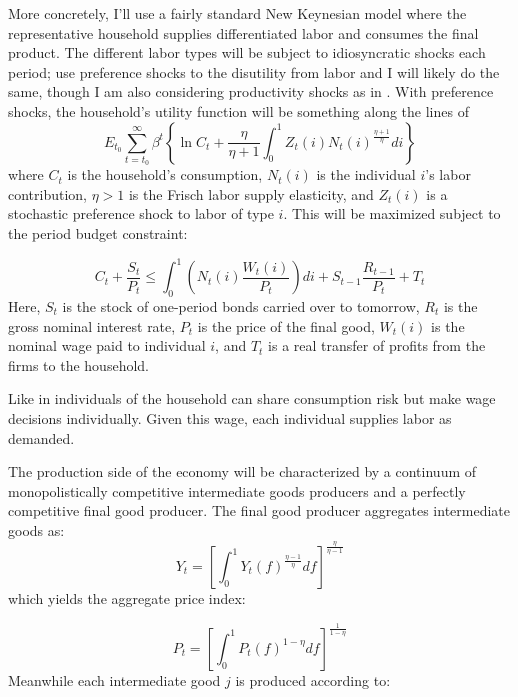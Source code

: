 \documentclass[12pt,a4paper]{article}            %
\begin{document}
More concretely, I'll use a fairly standard New Keynesian model where the representative household supplies differentiated labor and consumes the final product.
The different labor types will be subject to idiosyncratic shocks each period; \cite{daly_hobijn_2013} use preference shocks to the disutility from labor and I will likely do the same, though I am also considering productivity shocks as in \cite{fagan_messina_2009}. 
With preference shocks, the household's utility function will be something along the lines of
\begin{equation*}
    E_{t_0} \sum_{t=t_0}^{\infty} \beta^t \left\{\ln{C_t} + \frac{\eta}{\eta + 1} \int_{0}^{1} Z_t(i) N_t(i)^{\frac{\eta + 1}{\eta}} di \right\}
\end{equation*}
where $C_t$ is the household's consumption, $N_t(i)$ is the individual $i$'s labor contribution, $\eta > 1$ is the Frisch labor supply elasticity, and $Z_t(i)$ is a stochastic preference shock to labor of type $i$.
This will be maximized subject to the period budget constraint:

\begin{equation}
    C_t + \frac{S_t}{P_t} \leq \int_{0}^{1} \left( N_t(i) \frac{W_t(i)}{P_t}\right) di + S_{t-1}\frac{R_{t-1}}{P_t} + T_t
\end{equation}
Here, $S_t$ is the stock of one-period bonds carried over to tomorrow, $R_t$ is the gross nominal interest rate, $P_t$ is the price of the final good, $W_t(i)$ is the nominal wage paid to individual $i$, and $T_t$ is a real transfer of profits from the firms to the household.

Like in \cite{erceg_henderson_levin_1999} individuals of the household can share consumption risk but make wage decisions individually.
Given this wage, each individual supplies labor as demanded.

The production side of the economy will be characterized by a continuum of monopolistically competitive  intermediate goods producers and a perfectly competitive final good producer.
The final good producer aggregates intermediate goods as:
\begin{equation*}
    Y_t = \left[\int_{0}^{1} Y_t(f)^{ \frac{\eta - 1}{\eta}} df \right]^{ \frac{\eta}{\eta - 1} }
\end{equation*}
which yields the aggregate price index:

\begin{equation*}
    P_t = \left[\int_{0}^{1} P_t(f)^{1 - \eta} df \right]^{\frac{1}{1 - \eta}}
\end{equation*}
Meanwhile each intermediate good $j$ is produced according to:
\end{document}
